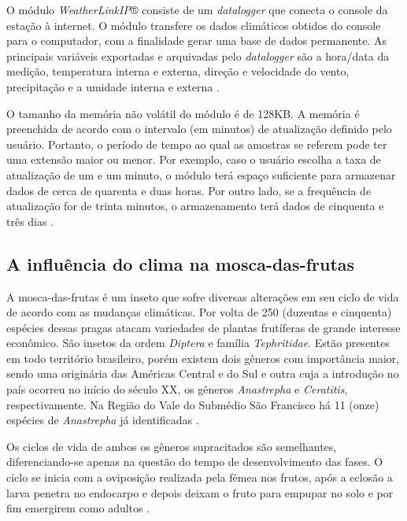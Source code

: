\newpage

O módulo \textit{WeatherLinkIP}® consiste de um \textit{datalogger} que conecta o console da estação à internet. O módulo transfere os dados climáticos obtidos do console para o computador, com a finalidade gerar uma base de dados permanente. As principais variáveis exportadas e arquivadas pelo \textit{datalogger} são a hora/data da medição, temperatura interna e externa, direção e velocidade do vento, precipitação e a umidade interna e externa \cite{WLIP}.

O tamanho da memória não volátil do módulo é de 128KB. A memória é preenchida de acordo com o intervalo (em minutos) de atualização definido pelo usuário. Portanto, o período de tempo ao qual as amostras se referem pode ter uma extensão maior ou menor. Por exemplo, caso o usuário escolha a taxa de atualização de um e um minuto, o módulo terá espaço suficiente para armazenar dados de cerca de quarenta e duas horas. Por outro lado, se a frequência de atualização for de trinta minutos, o armazenamento terá dados de cinquenta e três dias \cite{WLIP}.

\subsection{A influência do clima na mosca-das-frutas}

A mosca-das-frutas é um inseto que sofre diversas alterações em seu ciclo de vida de acordo com as mudanças climáticas. Por volta de 250 (duzentas e cinquenta) espécies dessas pragas atacam variedades de plantas frutíferas de grande interesse econômico. São insetos da ordem \textit{Diptera} e família \textit{Tephritidae}. Estão presentes em todo território brasileiro, porém existem dois gêneros com importância maior, sendo uma originária das Américas Central e do Sul e outra cuja a introdução no país ocorreu no início do século XX, os gêneros \textit{Anastrepha} e \textit{Ceratitis}, respectivamente. Na Região do Vale do Submédio São Francisco há 11 (onze) espécies de \textit{Anastrepha} já identificadas \cite{paranhos2008moscas}.

Os ciclos de vida de ambos os gêneros supracitados são semelhantes, diferencia\-ndo-se apenas na questão do tempo de desenvolvimento das fases. O ciclo se inicia com a oviposição realizada pela fêmea nos frutos, após a eclosão a larva penetra no endocarpo e depois deixam o fruto para empupar no solo e por fim emergirem como adultos \cite{paranhos2008moscas}.
  
